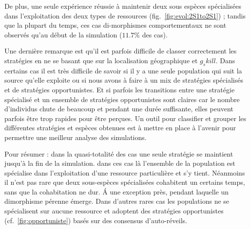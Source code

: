 \documentclass[a4paper,10pt]{report}
\begin{document}
	De plus, une seule expérience réussie à maintenir deux sous espèces spécialisées dans l'exploitation des deux types de ressources (fig.~\ref{fig:evol:2S1to2S1}) ; tandis que la plupart du temps, ces cas di-morphismes comportementaux ne sont observés qu'au début de la simulation ($11.7\%$ des cas).
	
	
	Une dernière remarque est qu'il est parfois difficile de classer correctement les stratégies en ne se basant que sur la localisation géographique et $g_skill$. Dans certains cas il est très difficile de savoir si il y a une seule population qui suit la source qu'elle exploite ou si nous avons à faire à un mix de stratégies spécialisés et de stratégies opportunistes. Et si parfois les transitions entre une stratégie spécialisé et un ensemble de stratégies opportunistes sont claires car le nombre d'individus chute de beaucoup et pendant une durée suffisante, elles peuvent parfois être trop rapides pour être per\c cues.  Un outil pour classifier et grouper les différentes stratégies et espèces obtenues est à mettre en place à l'avenir pour permettre une meilleur analyse des simulations.
	
	
	
	Pour résumer : dans la quasi-totalité des cas une seule stratégie se maintient jusqu'à la fin de la simulation. dans ces cas là l'ensemble de la population est spécialise dans l'exploitation d'une ressource particulière et s'y tient. Néanmoins il n'est pas rare que deux sous-espèces spécialisées cohabitent un certains temps, sans que la cohabitation ne dur. \'{A} une exception près, pendant laquelle un dimorphisme pérenne émerge. Dans d'autres rares cas les populations ne se spécialisent sur aucune ressource et adoptent des stratégies opportunistes (cf.~\ref{fig:opportuniste}) basés sur des consensus d'auto-réveils.
	
	\newcommand{\graphSize}{.65\textwidth}
	\newcommand{\myspace}{.1cm}
	
\end{document}
